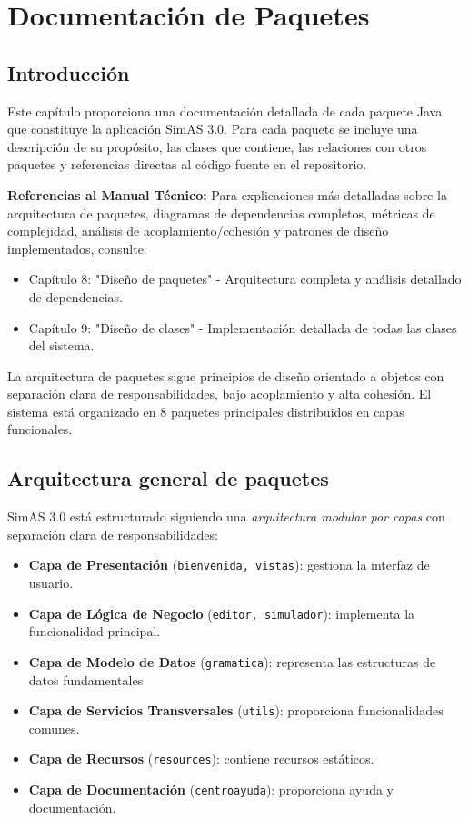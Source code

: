 \chapter{Documentación de Paquetes}\label{cap-documentacion-paquetes}

\section{Introducción}

Este capítulo proporciona una documentación detallada de cada paquete Java que constituye la aplicación SimAS 3.0. Para cada paquete se incluye una descripción de su propósito, las clases que contiene, las relaciones con otros paquetes y referencias directas al código fuente en el repositorio.

\textbf{Referencias al Manual Técnico:} Para explicaciones más detalladas sobre la arquitectura de paquetes, diagramas de dependencias completos, métricas de complejidad, análisis de acoplamiento/cohesión y patrones de diseño implementados, consulte:
\begin{itemize}
    \item Capítulo 8: "Diseño de paquetes" - Arquitectura completa y análisis detallado de dependencias.
    \item Capítulo 9: "Diseño de clases" - Implementación detallada de todas las clases del sistema.
\end{itemize}

La arquitectura de paquetes sigue principios de diseño orientado a objetos con separación clara de responsabilidades, bajo acoplamiento y alta cohesión. El sistema está organizado en 8 paquetes principales distribuidos en capas funcionales.

\section{Arquitectura general de paquetes}

SimAS 3.0 está estructurado siguiendo una \textit{arquitectura modular por capas} con separación clara de responsabilidades:

\begin{itemize}
    \item \textbf{Capa de Presentación} (\texttt{bienvenida, vistas}): gestiona la interfaz de usuario.
    \item \textbf{Capa de Lógica de Negocio} (\texttt{editor, simulador}): implementa la funcionalidad principal.
    \item \textbf{Capa de Modelo de Datos} (\texttt{gramatica}): representa las estructuras de datos fundamentales
    \item \textbf{Capa de Servicios Transversales} (\texttt{utils}): proporciona funcionalidades comunes.
    \item \textbf{Capa de Recursos} (\texttt{resources}): contiene recursos estáticos.
    \item \textbf{Capa de Documentación} (\texttt{centroayuda}): proporciona ayuda y documentación.
\end{itemize}

